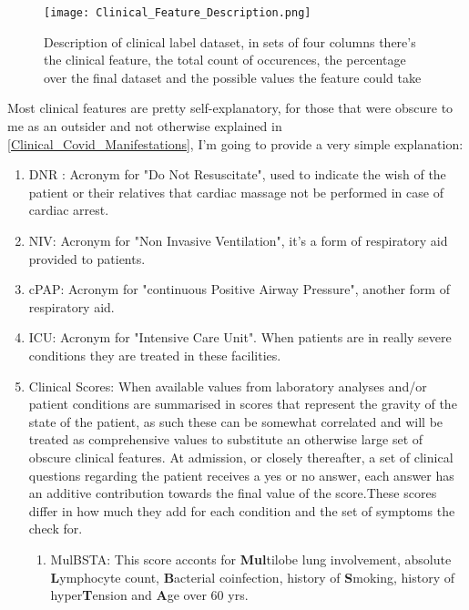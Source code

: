 \begin{figure}[H]
  		\texttt{[image: Clinical\_Feature\_Description.png]}
        \caption{Description of clinical label dataset, in sets of four columns there's the clinical feature, the total count of occurences, the percentage over the final dataset and the possible values the feature could take \label{fig:ClinicalFeatures}}
\end{figure}

Most clinical features are pretty self-explanatory, for those that were obscure to me as an outsider and not otherwise explained in \ref{Clinical_Covid_Manifestations}, I'm going to provide a very simple explanation:

\begin{enumerate}\label{clinical_features}
\item DNR : Acronym for "Do Not Resuscitate", used to indicate the wish of the patient or their relatives that cardiac massage not be performed in case of cardiac arrest.
\item NIV: Acronym for "Non Invasive Ventilation", it's a form of respiratory aid provided to patients.
\item cPAP: Acronym for  "continuous Positive Airway Pressure", another form of respiratory aid.
\item ICU: Acronym for "Intensive Care Unit". When patients are in really severe conditions they are treated in these facilities.
\item Clinical Scores: When available values from laboratory analyses and/or patient conditions are summarised in scores that represent the gravity of the state of the patient, as such these can be somewhat correlated and will be treated as comprehensive values to substitute an otherwise large set of obscure clinical features. At admission, or closely thereafter, a set of clinical questions regarding the patient receives a yes or no answer, each answer has an additive contribution towards the final value of the score.These scores differ in how much they add for each condition and the set of symptoms the check for.
	\begin{enumerate}
		\item MulBSTA: This score acconts for \textbf{Mul}tilobe lung involvement, absolute \textbf{L}ymphocyte count, \textbf{B}acterial coinfection, history of \textbf{S}moking, history of hyper\textbf{T}ension and \textbf{A}ge over 60 yrs. \cite{MulBSTA}

\end{enumerate}
\end{enumerate}
